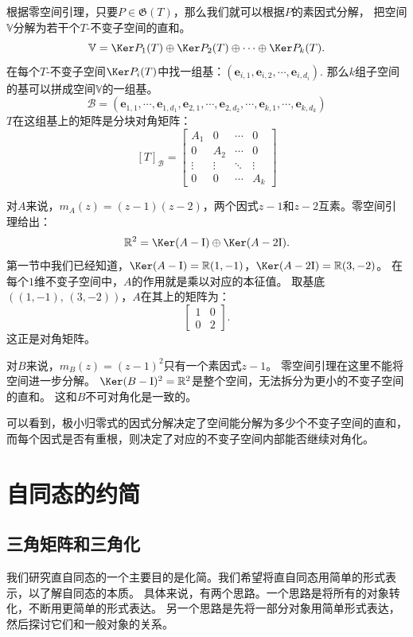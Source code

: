 \documentclass[12pt,UTF8]{ctexbook}
\begin{document}
根据零空间引理，只要$P\in\mathfrak{G}(T)$，那么我们就可以根据$P$的素因式分解，
把空间$\mathbb{V}$分解为若干个$T$-不变子空间的直和。
$$ \mathbb{V} = \Ker P_1(T) \oplus \Ker P_2(T) \oplus \cdots \oplus \Ker P_k(T). $$
在每个$T$-不变子空间$\Ker P_i(T)$中找一组基：$(\mathbf{e}_{i,1}, \mathbf{e}_{i,2}, \cdots , \mathbf{e}_{i, d_i})$.
那么$k$组子空间的基可以拼成空间$\mathbb{V}$的一组基。
$$ \mathcal{B} = (\mathbf{e}_{1,1}, \cdots , \mathbf{e}_{1, d_1},\mathbf{e}_{2,1}, \cdots , \mathbf{e}_{2, d_2}, \cdots , \mathbf{e}_{k,1}, \cdots , \mathbf{e}_{k, d_k})$$
$T$在这组基上的矩阵是分块对角矩阵：
$$ [T]_{\mathcal{B}} = \begin{bmatrix} A_1 & 0 & \cdots & 0 \\ 0 & A_2 & \cdots & 0 \\ \vdots & \vdots & \ddots & \vdots \\ 0 & 0 & \cdots & A_k\end{bmatrix}$$

对$A$来说，$m_A(z) = (z-1)(z-2)$，两个因式$z-1$和$z-2$互素。零空间引理给出：
$$
\mathbb{R}^2 = \Ker(A-\mathrm{I}) \oplus \Ker(A-2\mathrm{I}).
$$
第一节中我们已经知道，$\Ker(A-\mathrm{I}) = \mathbb{R}(1,-1)$，$\Ker(A-2\mathrm{I}) = \mathbb{R}(3,-2)$。
在每个$1$维不变子空间中，$A$的作用就是乘以对应的本征值。
取基底$((1,-1),\, (3,-2))$，$A$在其上的矩阵为：
$$
\begin{bmatrix} 1 & 0 \\ 0 & 2 \end{bmatrix}.
$$
这正是对角矩阵。

对$B$来说，$m_B(z) = (z-1)^2$只有一个素因式$z-1$。
零空间引理在这里不能将空间进一步分解。
$\Ker(B-\mathrm{I})^2 = \mathbb{R}^2$是整个空间，无法拆分为更小的不变子空间的直和。
这和$B$不可对角化是一致的。

可以看到，极小归零式的因式分解决定了空间能分解为多少个不变子空间的直和，
而每个因式是否有重根，则决定了对应的不变子空间内部能否继续对角化。

\section{自同态的约简}
\subsection{三角矩阵和三角化}
我们研究直自同态的一个主要目的是化简。我们希望将直自同态用简单的形式表示，以了解自同态的本质。
具体来说，有两个思路。一个思路是将所有的对象转化，不断用更简单的形式表达。
另一个思路是先将一部分对象用简单形式表达，然后探讨它们和一般对象的关系。
\end{document}
